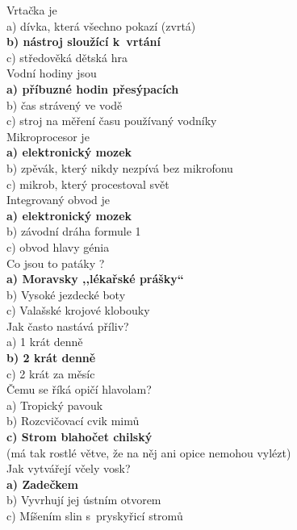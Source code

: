 \begin{multicols}{3}
\noindent
Vrtačka je\\
a) dívka, která všechno pokazí (zvrtá)\\
\textbf{b) nástroj sloužící k~vrtání}\\
c) středověká dětská hra\\

\noindent
Vodní hodiny jsou\\
\textbf{a) příbuzné hodin přesýpacích}\\
b) čas strávený ve vodě\\
c) stroj na měření času používaný vodníky\\

\noindent
Mikroprocesor je\\
\textbf{a) elektronický mozek}\\
b) zpěvák, který nikdy nezpívá bez mikrofonu\\
c) mikrob, který procestoval svět\\

\noindent
Integrovaný obvod je\\
\textbf{a) elektronický mozek}\\
b) závodní dráha formule 1\\
c) obvod hlavy génia\\

\noindent
Co jsou to patáky ?\\
\textbf{a) Moravsky ,,lékařské prášky``}\\
b) Vysoké jezdecké boty\\
c) Valašské krojové klobouky\\

\noindent
Jak často nastává příliv?\\
a) 1 krát denně\\
\textbf{b) 2 krát denně}\\
c) 2 krát za měsíc\\

\noindent
Čemu se říká opičí hlavolam?\\
a) Tropický pavouk\\
b) Rozcvičovací cvik mimů\\
\textbf{c) Strom blahočet chilský}\\
(má tak rostlé větve, že na něj ani opice nemohou vylézt)\\

\noindent
Jak vytvářejí včely vosk?\\
\textbf{a) Zadečkem}\\
b) Vyvrhují jej ústním otvorem\\
c) Míšením slin s~pryskyřicí stromů\\


\end{multicols}
